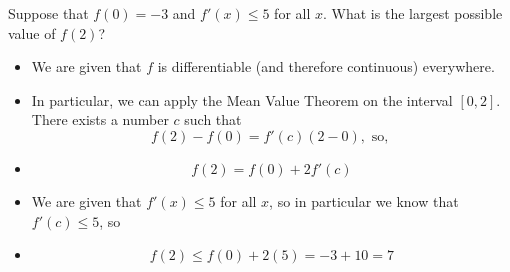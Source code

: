 \begin{frame}
\begin{example}
Suppose that $ f(0)=-3 $ and $ f'(x)\le 5 $ for all $ x. $ What is the largest possible value of $ f(2) $?
\small 
\begin{itemize}
\setlength\itemsep{0.2em}
\item<2->  We are given that $f$ is differentiable (and therefore continuous) everywhere. 
\item<3-> In particular, we can apply the Mean Value Theorem on the interval $[0, 2]$. There exists a number $c$ such that
\[
f(2)-f(0) = f'(c)(2 -0), \text{ so, }
\]
\item<4->
\[
f(2)= f(0)+2f'(c)
\]
\item<5->  We are given that $f ' (x)\le 5$ for all $x$, so in particular we know that $f '(c)\le 5$, so
\item<6->
\[
f(2)  \le  f(0)+2(5)= -3+10=7 
\]
\end{itemize}
\end{example}
\end{frame}

